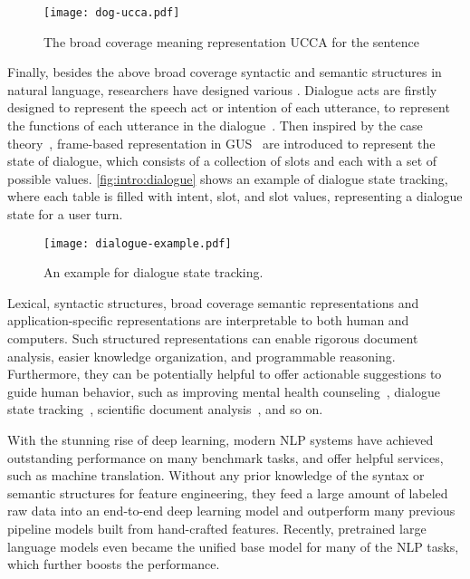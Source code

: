 \begin{figure}[!tbp]
\begin{center}
\texttt{[image: dog-ucca.pdf]}
\end{center}
\caption{\label{fig:intro:dog-ucca} The broad coverage meaning
  representation UCCA for the sentence \emph{}}
\end{figure}

Finally, besides the above broad coverage syntactic and semantic
structures in natural language, researchers have designed various
. Dialogue acts are
firstly designed to represent the speech act or intention of each
utterance, to represent the functions of each utterance in the
dialogue~\citep{wittgenstein2010philosophical,bunt2010towards}. Then
inspired by the case theory~\citep{Fillmore:68}, frame-based
representation in GUS~\citep{bobrow1977gus} are introduced to
represent the state of dialogue, which consists of a collection of
slots and each with a set of possible
values. \autoref{fig:intro:dialogue} shows an example of dialogue
state tracking, where each table is filled with intent, slot, and slot
values, representing a dialogue state for a user turn.

\begin{figure}[!tbp]
\begin{center}
\texttt{[image: dialogue-example.pdf]}
\end{center}
\caption{\label{fig:intro:dialogue} An example for dialogue state
  tracking.}
\end{figure}

Lexical, syntactic structures, broad coverage semantic representations
and application-specific representations are interpretable to both
human and computers. Such structured representations can enable
rigorous document analysis, easier knowledge organization, and
programmable reasoning. Furthermore, they can be potentially helpful
to offer actionable suggestions to guide human behavior, such as
improving mental health counseling~\citep{tanana2016comparison},
dialogue state tracking~\citep{budzianowski2018multiwoz}, scientific
document analysis~\citep{dernoncourt2017pubmed}, and so on.

With the stunning rise of deep learning, modern NLP systems have
achieved outstanding performance on many benchmark tasks, and offer
helpful services, such as machine translation. Without any prior
knowledge of the syntax or semantic structures for feature
engineering, they feed a large amount of labeled raw data
into an end-to-end deep learning model and outperform many previous
pipeline models built from hand-crafted features. Recently, pretrained
large language models even became the unified base model for many of
the NLP tasks, which further boosts the performance.

